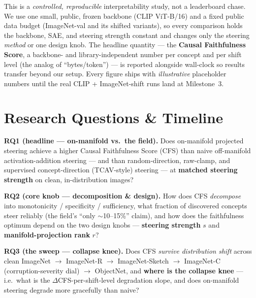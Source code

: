 \documentclass[11pt]{article}
\begin{document}
\begin{scopebox}
This is a \emph{controlled, reproducible} interpretability study, not a leaderboard
chase. We use one small, public, frozen backbone (CLIP ViT-B/16) and a fixed public
data budget (ImageNet-val and its shifted variants), so every comparison holds the
backbone, SAE, and steering strength constant and changes only the steering
\emph{method} or one design knob. The headline quantity --- the \textbf{Causal
Faithfulness Score}, a backbone- and library-independent number per concept and per
shift level (the analog of ``bytes/token'') --- is reported alongside wall-clock so
results transfer beyond our setup. Every figure ships with \emph{illustrative}
placeholder numbers until the real CLIP + ImageNet-shift runs land at Milestone~3.
\end{scopebox}

\section{Research Questions \& Timeline}

\textbf{RQ1 (headline --- on-manifold vs.\ the field).}
Does on-manifold projected steering achieve a higher Causal Faithfulness Score (CFS)
than naive off-manifold activation-addition steering --- and than random-direction,
raw-clamp, and supervised concept-direction (TCAV-style) steering --- at
\textbf{matched steering strength} on clean, in-distribution images?

\textbf{RQ2 (core knob --- decomposition \& design).}
How does CFS \emph{decompose} into monotonicity / specificity / sufficiency, what
fraction of discovered concepts steer reliably (the field's ``only $\sim$10--15\%''
claim), and how does the faithfulness optimum depend on the two design knobs ---
\textbf{steering strength} $s$ and \textbf{manifold-projection rank} $r$?

\textbf{RQ3 (the sweep --- collapse knee).}
Does CFS \emph{survive distribution shift} across clean ImageNet $\rightarrow$
ImageNet-R $\rightarrow$ ImageNet-Sketch $\rightarrow$ ImageNet-C (corruption-severity
dial) $\rightarrow$ ObjectNet, and \textbf{where is the collapse knee} --- i.e.\ what
is the $\Delta$CFS-per-shift-level degradation slope, and does on-manifold steering
degrade more gracefully than naive?
\end{document}
